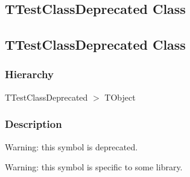 \documentclass{report}
\begin{document}
\subsection*{\large{\textbf{TTestClassDeprecated Class}}\normalsize\hspace{1ex}\hrulefill}
\else
\subsection*{TTestClassDeprecated Class}
\fi
\label{ok_hint_directives.TTestClassDeprecated}
\subsubsection*{\large{\textbf{Hierarchy}}\normalsize\hspace{1ex}\hfill}
TTestClassDeprecated {$>$} TObject
\subsubsection*{\large{\textbf{Description}}\normalsize\hspace{1ex}\hfill}
Warning: this symbol is deprecated.

Warning: this symbol is specific to some library.
\end{document}
